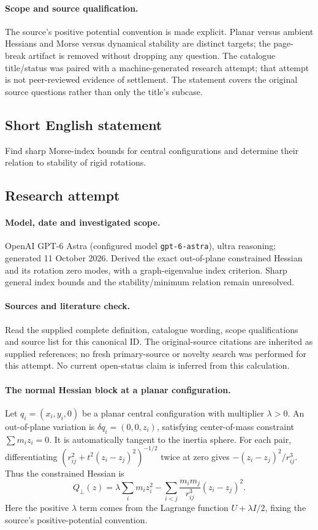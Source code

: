 \documentclass[11pt]{article}
\begin{document}
\paragraph{Scope and source qualification.}The source’s positive potential convention is made explicit. Planar versus ambient Hessians and Morse versus dynamical stability are distinct targets; the page-break artifact is removed without dropping any question. The catalogue title/status was paired with a machine-generated research attempt; that attempt is not peer-reviewed evidence of settlement. The statement covers the original source questions rather than only the title’s subcase.
\subsection{Short English statement}
Find sharp Morse-index bounds for central configurations and determine their relation to stability of rigid rotations.
\subsection{Research attempt}
\paragraph{Model, date and investigated scope.}
OpenAI GPT-6 Astra (configured model \texttt{gpt-6-astra}), ultra reasoning; generated 11 October 2026. Derived the exact out-of-plane constrained Hessian and its rotation zero modes, with a graph-eigenvalue index criterion. Sharp general index bounds and the stability/minimum relation remain unresolved.

\paragraph{Sources and literature check.}
Read the supplied complete definition, catalogue wording, scope qualifications and source list for this canonical ID. The original-source citations are inherited as supplied references; no fresh primary-source or novelty search was performed for this attempt. No current open-status claim is inferred from this calculation.

\paragraph{The normal Hessian block at a planar configuration.}Let \(q_i=(x_i,y_i,0)\) be a planar central configuration with multiplier \(\lambda>0\). An out-of-plane variation is \(\delta q_i=(0,0,z_i)\), satisfying center-of-mass constraint \(\sum m_iz_i=0\). It is automatically tangent to the inertia sphere. For each pair, differentiating \((r_{ij}^2+t^2(z_i-z_j)^2)^{-1/2}\) twice at zero gives \(-(z_i-z_j)^2/r_{ij}^3\). Thus the constrained Hessian is
\[Q_\perp(z)=\lambda\sum_im_iz_i^2-\sum_{i<j}\frac{m_im_j}{r_{ij}^3}(z_i-z_j)^2.
\]
Here the positive \(\lambda\) term comes from the Lagrange function \(U+\lambda I/2\), fixing the source's positive-potential convention.
\end{document}
